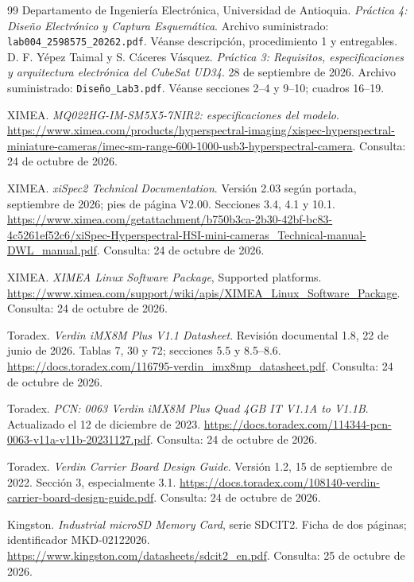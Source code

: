 \documentclass[11pt,letterpaper]{article}
\begin{document}
\begin{thebibliography}{99}
 Departamento de Ingeniería Electrónica, Universidad de Antioquia. \emph{Práctica 4: Diseño Electrónico y Captura Esquemática}. Archivo suministrado: \texttt{lab004\_2598575\_20262.pdf}. Véanse descripción, procedimiento 1 y entregables.
 D. F. Yépez Taimal y S. Cáceres Vásquez. \emph{Práctica 3: Requisitos, especificaciones y arquitectura electrónica del CubeSat UD34}. 28 de septiembre de 2026. Archivo suministrado: \texttt{Diseño\_Lab3.pdf}. Véanse secciones 2--4 y 9--10; cuadros 16--19.

 XIMEA. \emph{MQ022HG-IM-SM5X5-7NIR2: especificaciones del modelo}.
\url{https://www.ximea.com/products/hyperspectral-imaging/xispec-hyperspectral-miniature-cameras/imec-sm-range-600-1000-usb3-hyperspectral-camera}.
Consulta: 24 de octubre de 2026.

 XIMEA. \emph{xiSpec2 Technical Documentation}.
Versión 2.03 según portada, septiembre de 2026; pies de página V2.00.
Secciones 3.4, 4.1 y 10.1.
\url{https://www.ximea.com/getattachment/b750b3ca-2b30-42bf-bc83-4c5261ef52c6/xiSpec-Hyperspectral-HSI-mini-cameras_Technical-manual-DWL_manual.pdf}.
Consulta: 24 de octubre de 2026.

 XIMEA. \emph{XIMEA Linux Software Package}, Supported platforms.
\url{https://www.ximea.com/support/wiki/apis/XIMEA_Linux_Software_Package}.
Consulta: 24 de octubre de 2026.

 Toradex. \emph{Verdin iMX8M Plus V1.1 Datasheet}.
Revisión documental 1.8, 22 de junio de 2026. Tablas 7, 30 y 72;
secciones 5.5 y 8.5--8.6.
\url{https://docs.toradex.com/116795-verdin_imx8mp_datasheet.pdf}.
Consulta: 24 de octubre de 2026.

 Toradex. \emph{PCN: 0063 Verdin iMX8M Plus Quad
4GB IT V1.1A to V1.1B}. Actualizado el 12 de diciembre de 2023.
\url{https://docs.toradex.com/114344-pcn-0063-v11a-v11b-20231127.pdf}.
Consulta: 24 de octubre de 2026.

 Toradex. \emph{Verdin Carrier Board Design Guide}.
Versión 1.2, 15 de septiembre de 2022. Sección 3, especialmente 3.1.
\url{https://docs.toradex.com/108140-verdin-carrier-board-design-guide.pdf}.
Consulta: 24 de octubre de 2026.

 Kingston. \emph{Industrial microSD Memory Card},
serie SDCIT2. Ficha de dos páginas; identificador MKD-02122026.
\url{https://www.kingston.com/datasheets/sdcit2_en.pdf}.
Consulta: 25 de octubre de 2026.


\end{thebibliography}
\end{document}

